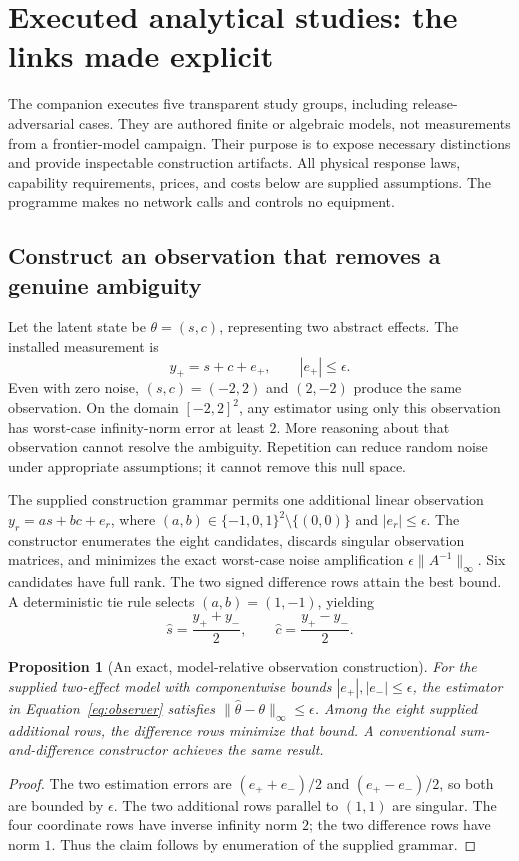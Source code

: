 \documentclass[11pt,letterpaper]{article}
\newtheorem{proposition}{Proposition}[section]
\theoremstyle{remark}\newtheorem{remark}{Remark}[section]
\begin{document}
\section{Executed analytical studies: the links made explicit}
\label{sec:study}
The companion executes five transparent study groups, including release-adversarial cases. They are authored finite or algebraic models, not measurements from a frontier-model campaign. Their purpose is to expose necessary distinctions and provide inspectable construction artifacts. All physical response laws, capability requirements, prices, and costs below are supplied assumptions. The programme makes no network calls and controls no equipment.

\subsection{Construct an observation that removes a genuine ambiguity}
Let the latent state be $\theta=(s,c)$, representing two abstract effects. The installed measurement is
\begin{equation}
y_+=s+c+e_+,\qquad |e_+|\leq\epsilon.
\label{eq:yplus}
\end{equation}
Even with zero noise, $(s,c)=(-2,2)$ and $(2,-2)$ produce the same observation. On the domain $[-2,2]^2$, any estimator using only this observation has worst-case infinity-norm error at least $2$. More reasoning about that observation cannot resolve the ambiguity. Repetition can reduce random noise under appropriate assumptions; it cannot remove this null space.

The supplied construction grammar permits one additional linear observation $y_r=a s+b c+e_r$, where $(a,b)\in\{-1,0,1\}^2\setminus\{(0,0)\}$ and $|e_r|\leq\epsilon$. The constructor enumerates the eight candidates, discards singular observation matrices, and minimizes the exact worst-case noise amplification $\epsilon\|A^{-1}\|_\infty$. Six candidates have full rank. The two signed difference rows attain the best bound. A deterministic tie rule selects $(a,b)=(1,-1)$, yielding
\begin{equation}
\widehat{s}=\frac{y_++y_-}{2},\qquad
\widehat{c}=\frac{y_+-y_-}{2}.
\label{eq:observer}
\end{equation}

\begin{proposition}[An exact, model-relative observation construction]
For the supplied two-effect model with componentwise bounds $|e_+|,|e_-|\leq\epsilon$, the estimator in Equation~\eqref{eq:observer} satisfies $\|\widehat\theta-\theta\|_\infty\leq\epsilon$. Among the eight supplied additional rows, the difference rows minimize that bound. A conventional sum-and-difference constructor achieves the same result.
\end{proposition}
\begin{proof}
The two estimation errors are $(e_++e_-)/2$ and $(e_+-e_-)/2$, so both are bounded by $\epsilon$. The two additional rows parallel to $(1,1)$ are singular. The four coordinate rows have inverse infinity norm $2$; the two difference rows have norm $1$. Thus the claim follows by enumeration of the supplied grammar.
\end{proof}
\end{document}
